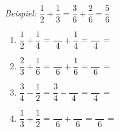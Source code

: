 \begin{enumerate}[label=\arabic*.]
    \textit{Beispiel:} $\dfrac{1}{2} + \dfrac{1}{3} = \dfrac{3}{6} + \dfrac{2}{6} = \dfrac{5}{6}$

    \vspace{0.5cm}

    \begin{enumerate}[label=\alph*)]
        \item $\dfrac{1}{2} + \dfrac{1}{4}$ = $\dfrac{\phantom{00}}{4} + \dfrac{1}{4}$ = $\dfrac{\phantom{00}}{4}$ = \underline{\hspace{3cm}}

        \vspace{0.5cm}

        \item $\dfrac{2}{3} + \dfrac{1}{6}$ = $\dfrac{\phantom{00}}{6} + \dfrac{1}{6}$ = $\dfrac{\phantom{00}}{6}$ = \underline{\hspace{3cm}}

        \vspace{0.5cm}

        \item $\dfrac{3}{4} - \dfrac{1}{2}$ = $\dfrac{3}{4} - \dfrac{\phantom{00}}{4}$ = $\dfrac{\phantom{00}}{4}$ = \underline{\hspace{3cm}}

        \vspace{0.5cm}

        \item $\dfrac{1}{3} + \dfrac{1}{2}$ = $\dfrac{\phantom{00}}{6} + \dfrac{\phantom{00}}{6}$ = $\dfrac{\phantom{00}}{6}$ = \underline{\hspace{3cm}}
    \end{enumerate}

\end{enumerate}